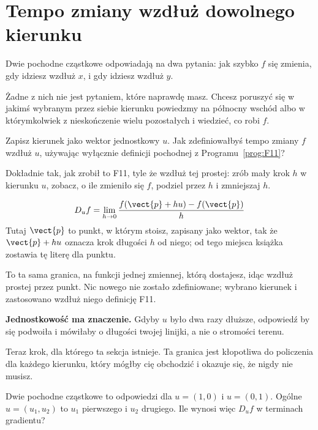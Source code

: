 \section{Tempo zmiany wzdłuż dowolnego kierunku}
\label{sec:P15-directional}

\begin{fr}
Dwie pochodne cząstkowe odpowiadają na dwa pytania: jak szybko $f$ się zmienia,
gdy idziesz wzdłuż $x$, i gdy idziesz wzdłuż $y$.

Żadne z nich nie jest pytaniem, które naprawdę masz. Chcesz poruszyć się w
jakimś wybranym przez siebie kierunku \dash{} powiedzmy na północny wschód albo
w którymkolwiek z nieskończenie wielu pozostałych \dash{} i wiedzieć, co robi
$f$.

Zapisz kierunek jako wektor jednostkowy $u$. Jak zdefiniowałbyś tempo zmiany
$f$ wzdłuż $u$, używając wyłącznie definicji pochodnej z
Programu~\ref{prog:F11}?
\dotline
\nextframe
\end{fr}

\begin{fr}
\begin{ansblock}
Dokładnie tak, jak zrobił to F11, tyle że wzdłuż tej prostej: zrób mały krok
$h$ w kierunku $u$, zobacz, o ile zmieniło się $f$, podziel przez $h$ i
zmniejszaj $h$.
\end{ansblock}

\[ D_u f = \lim_{h \to 0} \frac{f(\vect{p} + h u) - f(\vect{p})}{h} \]
Tutaj $\vect{p}$ to punkt, w którym stoisz, zapisany jako wektor, tak że
$\vect{p} + hu$ oznacza krok długości $h$ od niego; od tego miejsca książka
zostawia tę literę dla punktu.

To ta sama granica, na funkcji jednej zmiennej, którą dostajesz, idąc wzdłuż
prostej przez punkt. Nic nowego nie zostało zdefiniowane; wybrano kierunek i
zastosowano wzdłuż niego definicję F11.

\textbf{Jednostkowość ma znaczenie.} Gdyby $u$ było dwa razy dłuższe,
odpowiedź by się podwoiła i mówiłaby o długości twojej linijki, a nie o
stromości terenu.
\end{fr}

\begin{fr}
Teraz krok, dla którego ta sekcja istnieje. Ta granica jest kłopotliwa do
policzenia dla każdego kierunku, który mógłby cię obchodzić \dash{} i okazuje
się, że nigdy nie musisz.

Dwie pochodne cząstkowe to odpowiedzi dla $u = (1, 0)$ i $u = (0, 1)$. Ogólne
$u = (u_1, u_2)$ to $u_1$ pierwszego i $u_2$ drugiego. Ile wynosi więc
$D_u f$ w terminach gradientu?
\dotline
\nextframe
\end{fr}

